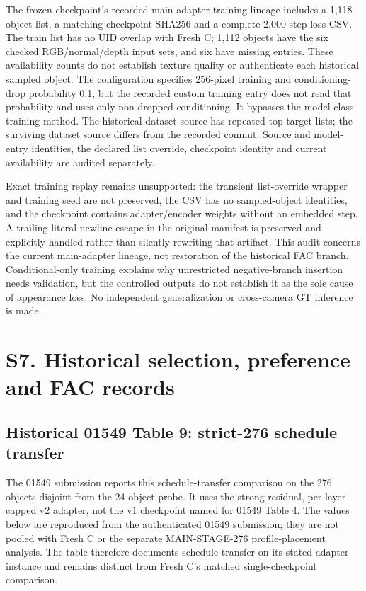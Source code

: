\documentclass[11pt]{article}
\begin{document}
The frozen checkpoint's recorded main-adapter training lineage includes a 1,118-object list, a matching checkpoint SHA256 and a complete 2,000-step loss CSV. The train list has no UID overlap with Fresh C; 1,112 objects have the six checked RGB/normal/depth input sets, and six have missing entries. These availability counts do not establish texture quality or authenticate each historical sampled object. The configuration specifies 256-pixel training and conditioning-drop probability 0.1, but the recorded custom training entry does not read that probability and uses only non-dropped conditioning. It bypasses the model-class training method. The historical dataset source has repeated-top target lists; the surviving dataset source differs from the recorded commit. Source and model-entry identities, the declared list override, checkpoint identity and current availability are audited separately.

Exact training replay remains unsupported: the transient list-override wrapper and training seed are not preserved, the CSV has no sampled-object identities, and the checkpoint contains adapter/encoder weights without an embedded step. A trailing literal newline escape in the original manifest is preserved and explicitly handled rather than silently rewriting that artifact. This audit concerns the current main-adapter lineage, not restoration of the historical FAC branch. Conditional-only training explains why unrestricted negative-branch insertion needs validation, but the controlled outputs do not establish it as the sole cause of appearance loss. No independent generalization or cross-camera GT inference is made.

\FloatBarrier
\section*{S7. Historical selection, preference and FAC records}
\label{supp:group7}

\subsection*{Historical 01549 Table 9: strict-276 schedule transfer}
The 01549 submission reports this schedule-transfer comparison on the 276 objects disjoint from the 24-object probe. It uses the strong-residual, per-layer-capped v2 adapter, not the v1 checkpoint named for 01549 Table 4. The values below are reproduced from the authenticated 01549 submission; they are not pooled with Fresh C or the separate MAIN-STAGE-276 profile-placement analysis. The table therefore documents schedule transfer on its stated adapter instance and remains distinct from Fresh C's matched single-checkpoint comparison.
\end{document}
